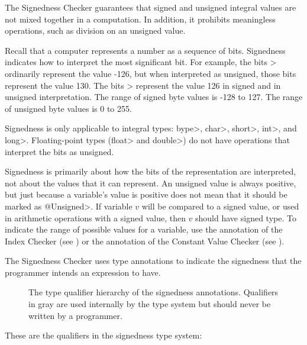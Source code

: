 \htmlhr
{}

The Signedness Checker guarantees that signed and unsigned integral values are not mixed
together in a computation. In addition, it prohibits meaningless operations, such
as division on an unsigned value.

Recall that a computer represents a number as a sequence of bits.
Signedness indicates how to interpret the most significant bit.  For
example, the bits > ordinarily represent the value -126, but when
interpreted as unsigned, those bits represent the value 130.  The bits
> represent the value 126 in signed and in unsigned interpretation.
The range of signed byte values is -128 to 127.  The range of unsigned byte
values is 0 to 255.

Signedness is only applicable to integral types:  \<bype>, \<char>,
\<short>, \<int>, and \<long>.  Floating-point types (\<float> and
\<double>) do not have operations that interpret the bits as unsigned.

Signedness is primarily about how the bits of the representation are
interpreted, not about the values that it can represent.  An unsigned value
is always positive, but just because a variable's value is positive does
not mean that it should be marked as \<@Unsigned>.  If variable $v$ will be
compared to a signed value, or used in arithmetic operations with a signed
value, then $v$ should have signed type.
To indicate the range of possible values for a variable, use the
 annotation of the Index
Checker (see ) or the
 annotation of the Constant Value
Checker (see ).



The Signedness Checker uses type annotations to indicate the signedness that the programmer intends an expression to have.

\begin{figure}
\caption{The type qualifier hierarchy of the signedness annotations.
Qualifiers in gray are used internally by the type system but should never be written by a programmer.}
\label{fig-signedness-hierarchy}
\end{figure}

These are the qualifiers in the signedness type system:

